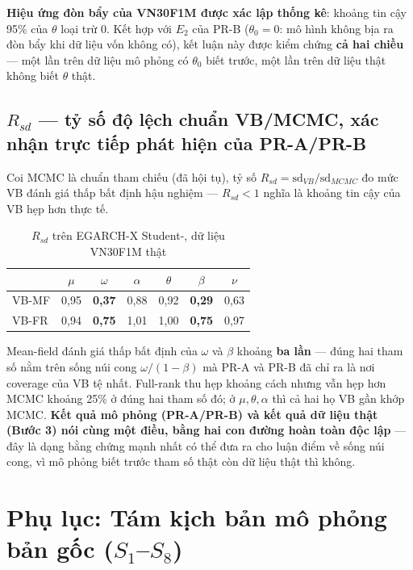 \documentclass[11pt,a4paper]{article}
\begin{document}
\textbf{Hiệu ứng đòn bẩy của VN30F1M được xác lập thống kê}: khoảng tin cậy
95\% của $\theta$ loại trừ 0. Kết hợp với $E_2$ của PR-B ($\theta_0=0$: mô hình
không bịa ra đòn bẩy khi dữ liệu vốn không có), kết luận này được kiểm chứng
\textbf{cả hai chiều} --- một lần trên dữ liệu mô phỏng có $\theta_0$ biết
trước, một lần trên dữ liệu thật không biết $\theta$ thật.

\subsection*{$R_{sd}$ --- tỷ số độ lệch chuẩn VB/MCMC, xác nhận trực tiếp phát hiện của PR-A/PR-B}

Coi MCMC là chuẩn tham chiếu (đã hội tụ), tỷ số $R_{sd}=\mathrm{sd}_{VB}/\mathrm{sd}_{MCMC}$
đo mức VB đánh giá thấp bất định hậu nghiệm --- $R_{sd}<1$ nghĩa là khoảng tin
cậy của VB hẹp hơn thực tế.

\begin{table}[H]\centering\small
\caption{$R_{sd}$ trên EGARCH-X Student-, dữ liệu VN30F1M thật}
\begin{tabularx}{\textwidth}{l C C C C C C}
\toprule
 & $\mu$ & $\omega$ & $\alpha$ & $\theta$ & $\beta$ & $\nu$ \\
\midrule
VB-MF & 0{,}95 & \textbf{0{,}37} & 0{,}88 & 0{,}92 & \textbf{0{,}29} & 0{,}63 \\
VB-FR & 0{,}94 & \textbf{0{,}75} & 1{,}01 & 1{,}00 & \textbf{0{,}75} & 0{,}97 \\
\bottomrule
\end{tabularx}
\end{table}

Mean-field đánh giá thấp bất định của $\omega$ và $\beta$ khoảng \textbf{ba
lần} --- đúng hai tham số nằm trên sống núi cong $\omega/(1-\beta)$ mà PR-A và
PR-B đã chỉ ra là nơi coverage của VB tệ nhất. Full-rank thu hẹp khoảng cách
nhưng vẫn hẹp hơn MCMC khoảng 25\% ở đúng hai tham số đó; ở $\mu,\theta,\alpha$
thì cả hai họ VB gần khớp MCMC. \textbf{Kết quả mô phỏng (PR-A/PR-B) và kết
quả dữ liệu thật (Bước 3) nói cùng một điều, bằng hai con đường hoàn toàn độc
lập} --- đây là dạng bằng chứng mạnh nhất có thể đưa ra cho luận điểm về sống
núi cong, vì mô phỏng biết trước tham số thật còn dữ liệu thật thì không.

\clearpage
\section{Phụ lục: Tám kịch bản mô phỏng bản gốc (\texorpdfstring{$S_1$--$S_8$}{S1-S8})}
\end{document}

